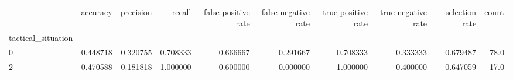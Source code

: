 \begin{tabular}{lrrrrrrrrr}
\toprule
{} &  accuracy &  precision &    recall &  false positive rate &  false negative rate &  true positive rate &  true negative rate &  selection rate &  count \\
tactical\_situation &           &            &           &                      &                      &                     &                     &                 &        \\
\midrule
0                  &  0.448718 &   0.320755 &  0.708333 &             0.666667 &             0.291667 &            0.708333 &            0.333333 &        0.679487 &   78.0 \\
2                  &  0.470588 &   0.181818 &  1.000000 &             0.600000 &             0.000000 &            1.000000 &            0.400000 &        0.647059 &   17.0 \\
\bottomrule
\end{tabular}

